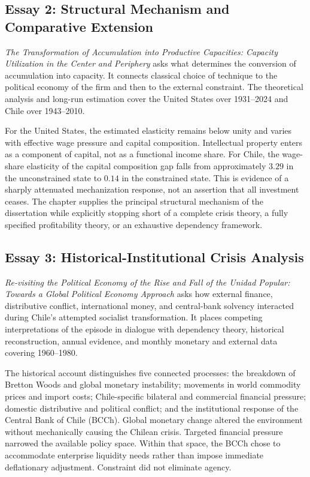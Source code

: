 \subsection*{Essay 2: Structural Mechanism and Comparative Extension}

\emph{The Transformation of Accumulation into Productive Capacities: Capacity Utilization in the Center and Periphery} asks what determines the conversion of accumulation into capacity. It connects classical choice of technique to the political economy of the firm and then to the external constraint. The theoretical analysis and long-run estimation cover the United States over 1931--2024 and Chile over 1943--2010.

For the United States, the estimated elasticity remains below unity and varies with effective wage pressure and capital composition. Intellectual property enters as a component of capital, not as a functional income share. For Chile, the wage-share elasticity of the capital composition gap falls from approximately $3.29$ in the unconstrained state to $0.14$ in the constrained state. This is evidence of a sharply attenuated mechanization response, not an assertion that all investment ceases. The chapter supplies the principal structural mechanism of the dissertation while explicitly stopping short of a complete crisis theory, a fully specified profitability theory, or an exhaustive dependency framework.

\subsection*{Essay 3: Historical-Institutional Crisis Analysis}

\emph{Re-visiting the Political Economy of the Rise and Fall of the Unidad Popular: Towards a Global Political Economy Approach} asks how external finance, distributive conflict, international money, and central-bank solvency interacted during Chile's attempted socialist transformation. It places competing interpretations of the episode in dialogue with dependency theory, historical reconstruction, annual evidence, and monthly monetary and external data covering 1960--1980.

The historical account distinguishes five connected processes: the breakdown of Bretton Woods and global monetary instability; movements in world commodity prices and import costs; Chile-specific bilateral and commercial financial pressure; domestic distributive and political conflict; and the institutional response of the Central Bank of Chile (BCCh). Global monetary change altered the environment without mechanically causing the Chilean crisis. Targeted financial pressure narrowed the available policy space. Within that space, the BCCh chose to accommodate enterprise liquidity needs rather than impose immediate deflationary adjustment. Constraint did not eliminate agency.

